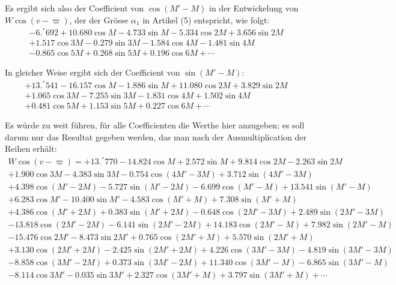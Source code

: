 \documentclass[12pt,a4paper]{article}
\begin{document}
Es ergibt sich also der Coefficient von $\cos(M'-M)$ in der Entwickelung von $W \cos(v-\varpi)$, der der Grösse $\alpha_1$ in Artikel (5) entspricht, wie folgt:
\begin{multline*}
-6.^{''}692 + 10.680 \cos M - 4.733 \sin M - 5.334 \cos 2M + 3.656 \sin 2M\\
+ 1.517 \cos 3M - 0.279 \sin 3M - 1.584 \cos 4M - 1.481 \sin 4M\\
- 0.865 \cos 5M + 0.268 \sin 5M + 0.196 \cos 6M + \cdots
\end{multline*}

In gleicher Weise ergibt sich der Coefficient von $\sin(M'-M)$:
\begin{multline*}
+13.^{''}541 - 16.157 \cos M - 1.886 \sin M + 11.080 \cos 2M + 3.829 \sin 2M\\
+ 1.065 \cos 3M - 7.255 \sin 3M - 1.831 \cos 4M + 1.502 \sin 4M\\
+ 0.481 \cos 5M + 1.153 \sin 5M + 0.227 \cos 6M + \cdots
\end{multline*}

Es würde zu weit führen, für alle Coefficienten die Werthe hier anzugeben; es soll darum nur das Resultat gegeben werden, das man nach der Ausmultiplication der Reihen erhält:
\begin{multline*}
W \cos(v-\varpi) = +13.^{''}770 - 14.824 \cos M + 2.572 \sin M + 9.814 \cos 2M - 2.263 \sin 2M\\
+ 1.900 \cos 3M - 4.383 \sin 3M - 0.754 \cos(4M' - 3M) + 3.712 \sin(4M' - 3M)\\
+ 4.398 \cos(M' - 2M) - 5.727 \sin(M' - 2M) - 6.699 \cos(M' - M) + 13.541 \sin(M' - M)\\
+ 6.283 \cos M' - 10.400 \sin M' - 4.583 \cos(M' + M) + 7.308 \sin(M' + M)\\
+ 4.386 \cos(M' + 2M) + 0.383 \sin(M' + 2M) - 0.648 \cos(2M' - 3M) + 2.489 \sin(2M' - 3M)\\
- 13.818 \cos(2M' - 2M) - 6.141 \sin(2M' - 2M) + 14.183 \cos(2M' - M) + 7.982 \sin(2M' - M)\\
- 15.476 \cos 2M' - 8.473 \sin 2M' + 0.765 \cos(2M' + M) + 5.570 \sin(2M' + M)\\
+ 3.130 \cos(2M' + 2M) - 2.425 \sin(2M' + 2M) + 4.226 \cos(3M' - 3M) - 4.819 \sin(3M' - 3M)\\
- 8.858 \cos(3M' - 2M) + 0.373 \sin(3M' - 2M) + 11.340 \cos(3M' - M) - 6.865 \sin(3M' - M)\\
- 8.114 \cos 3M' - 0.035 \sin 3M' + 2.327 \cos(3M' + M) + 3.797 \sin(3M' + M) + \cdots
\end{multline*}
\end{document}
